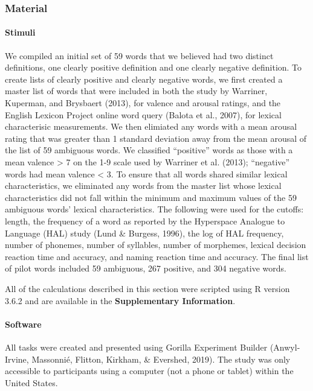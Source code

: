 \documentclass[man]{apa6}
\let\oldparagraph\paragraph
\renewcommand{\paragraph}[1]{\oldparagraph{#1}\mbox{}}
\begin{document}
\hypertarget{material}{%
\subsubsection{Material}\label{material}}

\hypertarget{stimuli}{%
\paragraph{Stimuli}\label{stimuli}}

We compiled an initial set of 59 words that we believed had two distinct definitions, one clearly positive definition and one clearly negative definition. To create lists of clearly positive and clearly negative words, we first created a master list of words that were included in both the study by Warriner, Kuperman, and Brysbaert (2013), for valence and arousal ratings, and the English Lexicon Project online word query (Balota et al., 2007), for lexical characterisic measurements. We then elimiated any words with a mean arousal rating that was greater than 1 standard deviation away from the mean arousal of the list of 59 ambiguous words. We classified \enquote{positive} words as those with a mean valence \textgreater{} 7 on the 1-9 scale used by Warriner et al. (2013); \enquote{negative} words had mean valence \textless{} 3. To ensure that all words shared similar lexical characteristics, we eliminated any words from the master list whose lexical characteristics did not fall within the minimum and maximum values of the 59 ambiguous words' lexical characteristics. The following were used for the cutoffs: length, the frequency of a word as reported by the Hyperspace Analogue to Language (HAL) study (Lund \& Burgess, 1996), the log of HAL frequency, number of phonemes, number of syllables, number of morphemes, lexical decision reaction time and accuracy, and naming reaction time and accuracy. The final list of pilot words included 59 ambiguous, 267 positive, and 304 negative words.

All of the calculations described in this section were scripted using R version 3.6.2 and are available in the \textbf{Supplementary Information}.

\hypertarget{software}{%
\paragraph{Software}\label{software}}

All tasks were created and presented using Gorilla Experiment Builder (Anwyl-Irvine, Massonnié, Flitton, Kirkham, \& Evershed, 2019). The study was only accessible to participants using a computer (not a phone or tablet) within the United States.
\end{document}
